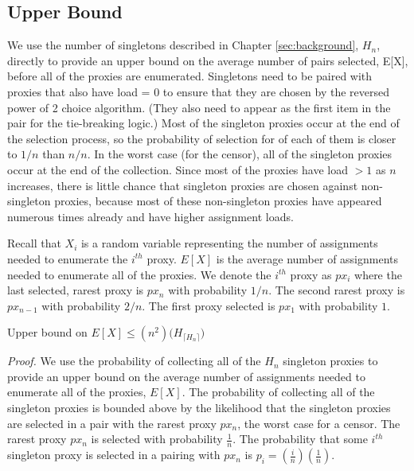 \subsection{Upper Bound}  

We use the number of singletons described in Chapter \ref{sec:background}, $H_n$, directly to provide an upper bound on the average number of pairs selected, E[X], before all of the proxies are enumerated. Singletons need to be paired with proxies that also have load = 0 to ensure that they are chosen by the reversed power of 2 choice algorithm. (They also need to appear as the first item in the pair for the tie-breaking logic.) Most of the singleton proxies occur at the end of the selection process, so the probability of selection for of each of them is closer to $1/n$ than $n/n$. In the worst case (for the censor), all of the singleton proxies occur at the end of the collection. Since most of the proxies have load $> 1$ as $n$ increases, there is little chance that singleton proxies are chosen against non-singleton proxies, because most of these non-singleton proxies have appeared numerous times already and have higher assignment loads.

Recall that $X_i$ is a random variable representing the number of assignments needed to enumerate the $i^{th}$ proxy. $E[X]$ is the average number of assignments needed to enumerate all of the proxies. We denote the $i^{th}$ proxy as $px_i$ where the last selected, rarest proxy is $px_{n}$ with probability $1/n$. The second rarest proxy is $px_{n-1}$ with probability $2/n$. The first proxy selected is $px_1$ with probability $1$.\\
 
\label{theorem:UBEX}
\begin{theorem} {Upper bound on $E[X] \leq (n^2) \bigg(H_{\lceil{H_n}\rceil}\bigg)$} 
\end{theorem}

\emph{Proof.} We use the probability of collecting all of the $H_n$ singleton proxies to provide an upper bound on the average number of assignments needed to enumerate all of the proxies, $E[X]$. The probability of collecting all of the singleton proxies is bounded above by the likelihood that the singleton proxies are selected in a pair with the rarest proxy $px_n$, the worst case for a censor. The rarest proxy $px_n$ is selected with probability $\frac{1}{n}$. The probability that some $i^{th}$ singleton proxy is selected in a pairing with $px_n$ is $p_i = (\frac{i}{n})(\frac{1}{n})$. 

